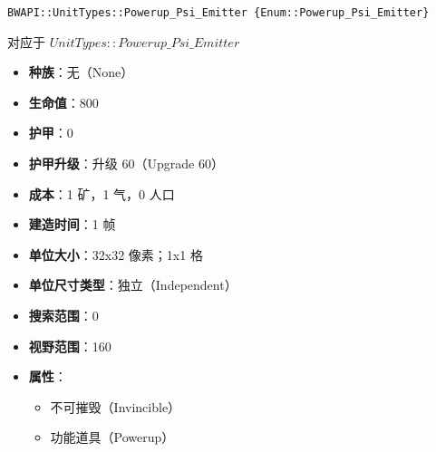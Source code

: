 \begin{tcolorbox}[colback=white, colframe=black!60!white, title=Powerup\_Psi\_Emitter(), arc=0mm]
    \begin{verbatim}
BWAPI::UnitTypes::Powerup_Psi_Emitter {Enum::Powerup_Psi_Emitter}
    \end{verbatim}
    对应于  $UnitTypes::Powerup\_Psi\_Emitter$ 
    \begin{itemize}
        \item \textbf{种族}：无（None）
        \item \textbf{生命值}：800
        \item \textbf{护甲}：0
        \item \textbf{护甲升级}：升级 60（Upgrade 60）
        \item \textbf{成本}：1 矿，1 气，0 人口
        \item \textbf{建造时间}：1 帧
        \item \textbf{单位大小}：32x32 像素；1x1 格
        \item \textbf{单位尺寸类型}：独立（Independent）
        \item \textbf{搜索范围}：0
        \item \textbf{视野范围}：160
        \item \textbf{属性}：
            \begin{itemize}
                \item 不可摧毁（Invincible）
                \item 功能道具（Powerup）
            \end{itemize}
    \end{itemize}
\end{tcolorbox}

